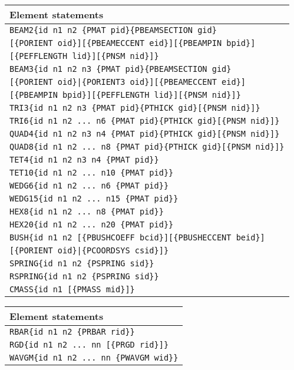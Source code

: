 \noindent
  \begin{tabular}{| m{} |}
  \hline
  \rowcolor[HTML]{EFEFEF}
  Element statements \\
  \hline\hline
  {\tt BEAM2\{id n1 n2 \{PMAT pid\}\{PBEAMSECTION gid\}} \\\hskip11mm
  {\tt[\{PORIENT oid\}][\{PBEAMECCENT eid\}][\{PBEAMPIN bpid\}]} \\\hskip11mm
  {\tt[\{PEFFLENGTH lid\}][\{PNSM nid\}]\}} \\
  \hline
  {\tt BEAM3\{id n1 n2 n3 \{PMAT pid\}\{PBEAMSECTION gid\}} \\\hskip11mm
  {\tt[\{PORIENT oid\}|\{PORIENT3 oid\}][\{PBEAMECCENT eid\}]} \\\hskip11mm
  {\tt[\{PBEAMPIN bpid\}][\{PEFFLENGTH lid\}][\{PNSM nid\}]\}} \\
  \hline
  {\tt TRI3\{id n1 n2 n3 \{PMAT pid\}\{PTHICK gid\}[\{PNSM nid\}]\}} \\
  \hline
  {\tt TRI6\{id n1 n2 ... n6 \{PMAT pid\}\{PTHICK gid\}[\{PNSM nid\}]\}} \\
  \hline
  {\tt QUAD4\{id n1 n2 n3 n4 \{PMAT pid\}\{PTHICK gid\}[\{PNSM nid\}]\}} \\
  \hline
  {\tt QUAD8\{id n1 n2 ... n8 \{PMAT pid\}\{PTHICK gid\}[\{PNSM nid\}]\}} \\
  \hline
  {\tt TET4\{id n1 n2 n3 n4 \{PMAT pid\}\}} \\
  \hline
  {\tt TET10\{id n1 n2 ... n10 \{PMAT pid\}\}} \\
  \hline
  {\tt WEDG6\{id n1 n2 ... n6 \{PMAT pid\}\}} \\
  \hline
  {\tt WEDG15\{id n1 n2 ... n15 \{PMAT pid\}\}} \\
  \hline
  {\tt HEX8\{id n1 n2 ... n8 \{PMAT pid\}\}} \\
  \hline
  {\tt HEX20\{id n1 n2 ... n20 \{PMAT pid\}\}} \\
  \hline
  {\tt BUSH\{id n1 n2 [\{PBUSHCOEFF bcid\}][\{PBUSHECCENT beid\}]} \\\hskip9mm
  {\tt[\{PORIENT oid\}|\{PCOORDSYS csid\}]\}} \\
  \hline
  {\tt SPRING\{id n1 n2 \{PSPRING sid\}\}} \\
  \hline
  {\tt RSPRING\{id n1 n2 \{PSPRING sid\}\}} \\
  \hline
  {\tt CMASS\{id n1 [\{PMASS mid\}]\}} \\
  \hline
\end{tabular}

\noindent
\begin{tabular}{| m{} |}
  \hline
  \rowcolor[HTML]{EFEFEF}
  Element statements   \\
  \hline\hline
  {\tt RBAR\{id n1 n2 \{PRBAR rid\}\}}\\
  \hline
  {\tt RGD\{id n1 n2 ... nn [\{PRGD rid\}]\}} \\
  \hline
  {\tt WAVGM\{id n1 n2 ... nn \{PWAVGM wid\}\}} \\
  \hline
\end{tabular}

